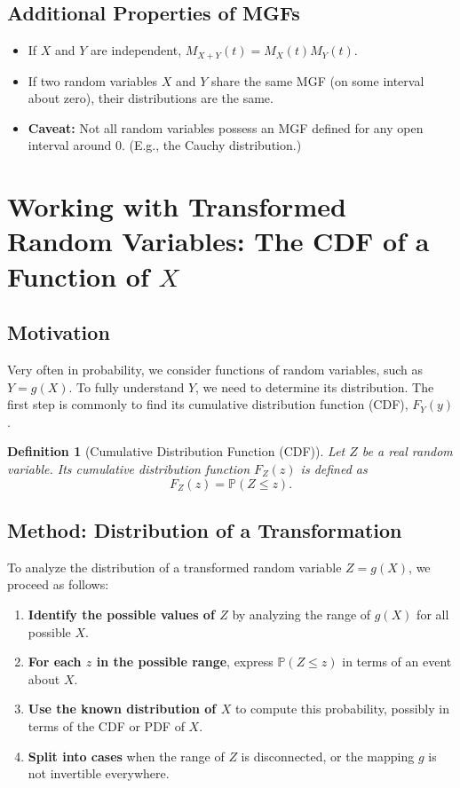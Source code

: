 \documentclass[12pt]{article}
\newtheorem{definition}{Definition}[section]
\begin{document}
\subsection{Additional Properties of MGFs}

\begin{itemize}
    \item If $X$ and $Y$ are independent, $M_{X+Y}(t) = M_X(t) M_Y(t)$.
    \item If two random variables $X$ and $Y$ share the same MGF (on some interval about zero), their distributions are the same.
    \item \textbf{Caveat:} Not all random variables possess an MGF defined for any open interval around $0$. (E.g., the Cauchy distribution.)
\end{itemize}

\section{Working with Transformed Random Variables: The CDF of a Function of $X$}
\subsection{Motivation}

Very often in probability, we consider functions of random variables, such as $Y = g(X)$. To fully understand $Y$, we need to determine its distribution. The first step is commonly to find its cumulative distribution function (CDF), $F_Y(y)$.

\begin{definition}[Cumulative Distribution Function (CDF)]
    Let $Z$ be a real random variable. Its cumulative distribution function $F_Z(z)$ is defined as
    \[
        F_Z(z) = \mathbb{P}(Z \leq z).
    \]
\end{definition}

\subsection{Method: Distribution of a Transformation}

To analyze the distribution of a transformed random variable $Z = g(X)$, we proceed as follows:

\begin{enumerate}[topsep=0.5em]
    \item \textbf{Identify the possible values of $Z$} by analyzing the range of $g(X)$ for all possible $X$.
    \item \textbf{For each $z$ in the possible range}, express $\mathbb{P}(Z \leq z)$ in terms of an event about $X$.
    \item \textbf{Use the known distribution of $X$} to compute this probability, possibly in terms of the CDF or PDF of $X$.
    \item \textbf{Split into cases} when the range of $Z$ is disconnected, or the mapping $g$ is not invertible everywhere.
\end{enumerate}
\end{document}
